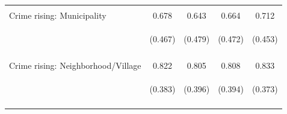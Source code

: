 \begin{center}
\begin{tabular}{lcccc}
 & \begin{footnotesize}\end{footnotesize} & \begin{footnotesize}\end{footnotesize} & \begin{footnotesize}\end{footnotesize} & \begin{footnotesize}\end{footnotesize}\\
\noalign{\smallskip}Crime rising: Municipality & 0.678 & 0.643 & 0.664 & 0.712\\
 & \begin{footnotesize}(0.467)\end{footnotesize} & \begin{footnotesize}(0.479)\end{footnotesize} & \begin{footnotesize}(0.472)\end{footnotesize} & \begin{footnotesize}(0.453)\end{footnotesize}\\
 & \begin{footnotesize}\end{footnotesize} & \begin{footnotesize}\end{footnotesize} & \begin{footnotesize}\end{footnotesize} & \begin{footnotesize}\end{footnotesize}\\
\noalign{\smallskip}Crime rising: Neighborhood/Village & 0.822 & 0.805 & 0.808 & 0.833\\
 & \begin{footnotesize}(0.383)\end{footnotesize} & \begin{footnotesize}(0.396)\end{footnotesize} & \begin{footnotesize}(0.394)\end{footnotesize} & \begin{footnotesize}(0.373)\end{footnotesize}\\
 & \begin{footnotesize}\end{footnotesize} & \begin{footnotesize}\end{footnotesize} & \begin{footnotesize}\end{footnotesize} & \begin{footnotesize}\end{footnotesize}\\

\end{tabular}
\end{center}
